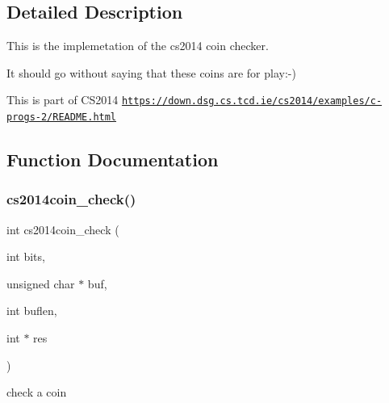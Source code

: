 \subsection{Detailed Description}
This is the implemetation of the cs2014 coin checker. 

It should go without saying that these coins are for play\+:-\/)

This is part of C\+S2014 \href{https://down.dsg.cs.tcd.ie/cs2014/examples/c-progs-2/README.html}{\tt https\+://down.\+dsg.\+cs.\+tcd.\+ie/cs2014/examples/c-\/progs-\/2/\+R\+E\+A\+D\+M\+E.\+html} 

\subsection{Function Documentation}
\mbox{\label{cs2014coin-check_8c_ae7d692031170a392c66b9810c65a79a3}} 
\subsubsection{\texorpdfstring{cs2014coin\+\_\+check()}{cs2014coin\_check()}}
{\footnotesize\ttfamily int cs2014coin\+\_\+check (\begin{DoxyParamCaption}\item[{int}]{bits,  }\item[{unsigned char $\ast$}]{buf,  }\item[{int}]{buflen,  }\item[{int $\ast$}]{res }\end{DoxyParamCaption})}



check a coin 


